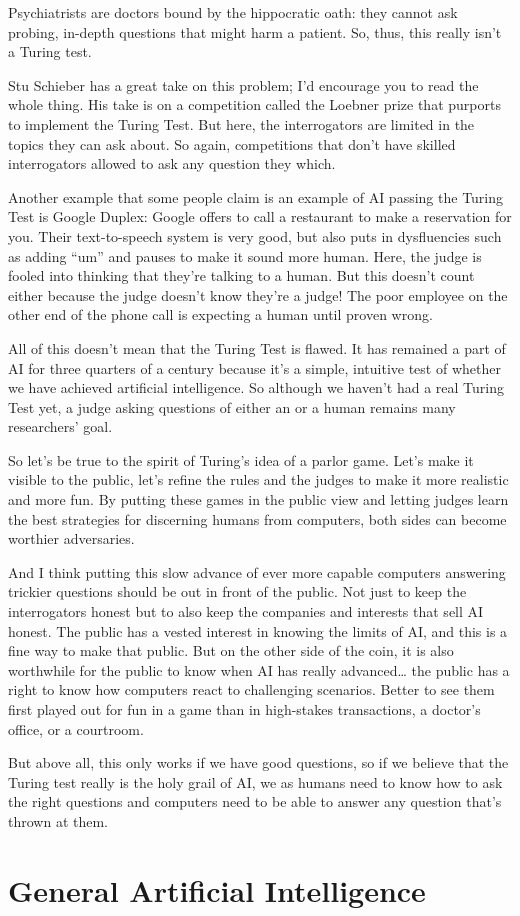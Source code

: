 Psychiatrists are doctors bound by the hippocratic oath: they cannot ask probing, in-depth questions that might harm a patient.  So, thus, this really isn’t a Turing test.

Stu Schieber has a great take on this problem; I’d encourage you to read the whole thing.  His take is on a competition called the Loebner prize that purports to implement the Turing Test.  But here, the interrogators are limited in the topics they can ask about.  So again, competitions that don’t have skilled interrogators allowed to ask any question they which.

Another example that some people claim is an example of AI passing the Turing Test is Google Duplex: Google offers to call a restaurant to make a reservation for you.  Their text-to-speech system is very good, but also puts in dysfluencies such as adding ``um'' and pauses to make it sound more human.  Here, the judge is fooled into thinking that they’re talking to a human.  But this doesn’t count either because the judge doesn’t know they’re a judge!  The poor employee on the other end of the phone call is expecting a human until proven wrong.

All of this doesn’t mean that the Turing Test is flawed.  It has remained a part of AI for three quarters of a century because it’s a simple, intuitive test of whether we have achieved artificial intelligence.  So although we haven’t had a real Turing Test yet, a judge asking questions of either an  or a human remains many researchers’ goal.

So let’s be true to the spirit of Turing’s idea of a parlor game.  Let’s make it visible to the public, let’s refine the rules and the judges to make it more realistic and more fun.  By putting these games in the public view and letting judges learn the best strategies for discerning humans from computers, both sides can become worthier adversaries.  

And I think putting this slow advance of ever more capable computers answering trickier questions should be out in front of the public.  Not just to keep the interrogators honest but to also keep the companies and interests that sell AI honest.  The public has a vested interest in knowing the limits of AI, and this is a fine way to make that public.  But on the other side of the coin, it is also worthwhile for the public to know when AI has really advanced… the public has a right to know how computers react to challenging scenarios.  Better to see them first played out for fun in a game than in high-stakes transactions, a doctor’s office, or a courtroom.

But above all, this only works if we have good questions, so if we believe that the Turing test really is the holy grail of AI, we as humans need to know how to ask the right questions and computers need to be able to answer any question that’s thrown at them.

\section{General Artificial Intelligence}
\label{sec:turing:gai}
